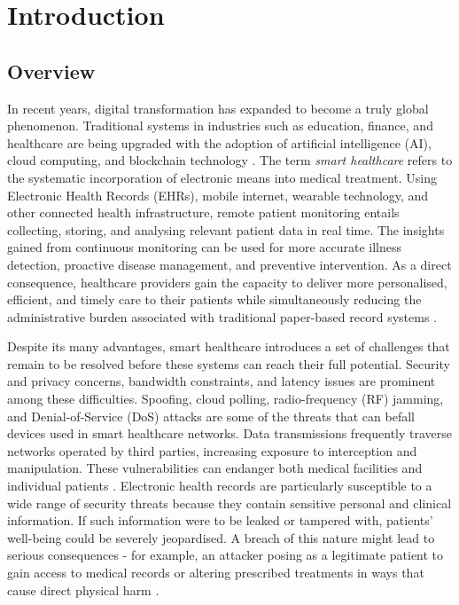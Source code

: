 \chapter{Introduction}

\section{Overview}

In recent years, digital transformation has expanded to become a truly global phenomenon. Traditional systems in industries such as education, finance, and healthcare are being upgraded with the adoption of artificial intelligence (AI), cloud computing, and blockchain technology \cite{zhang2021}. The term \textit{smart healthcare} refers to the systematic incorporation of electronic means into medical treatment. Using Electronic Health Records (EHRs), mobile internet, wearable technology, and other connected health infrastructure, remote patient monitoring entails collecting, storing, and analysing relevant patient data in real time. The insights gained from continuous monitoring can be used for more accurate illness detection, proactive disease management, and preventive intervention. As a direct consequence, healthcare providers gain the capacity to deliver more personalised, efficient, and timely care to their patients while simultaneously reducing the administrative burden associated with traditional paper-based record systems \cite{tian2019,mohanty2016}.

Despite its many advantages, smart healthcare introduces a set of challenges that remain to be resolved before these systems can reach their full potential. Security and privacy concerns, bandwidth constraints, and latency issues are prominent among these difficulties. Spoofing, cloud polling, radio-frequency (RF) jamming, and Denial-of-Service (DoS) attacks are some of the threats that can befall devices used in smart healthcare networks. Data transmissions frequently traverse networks operated by third parties, increasing exposure to interception and manipulation. These vulnerabilities can endanger both medical facilities and individual patients \cite{zeadally2020}. Electronic health records are particularly susceptible to a wide range of security threats because they contain sensitive personal and clinical information. If such information were to be leaked or tampered with, patients' well-being could be severely jeopardised. A breach of this nature might lead to serious consequences - for example, an attacker posing as a legitimate patient to gain access to medical records or altering prescribed treatments in ways that cause direct physical harm \cite{alomar2021}.

